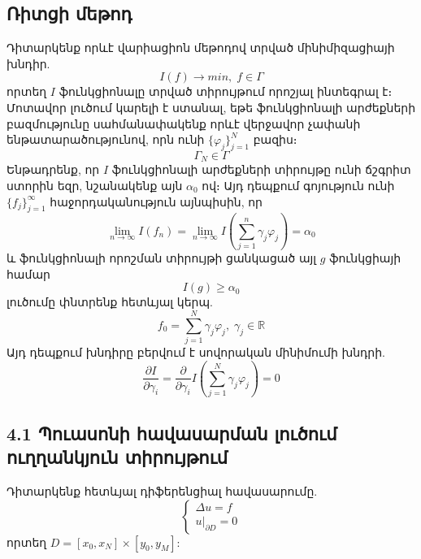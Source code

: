 \documentclass[fleqn, bachelor,subf,12pt,notitlepage]{article}
\begin{document}
\subsection*{Ռիտցի մեթոդ}
Դիտարկենք որևէ վարիացիոն մեթոդով տրված մինիմիզացիայի խնդիր.
		$$I\left(f\right) \longrightarrow min, \; f \in \Gamma$$
որտեղ $I$ ֆունկցիոնալը տրված տիրույթում որոշյալ ինտեգրալ է։
Մոտավոր լուծում կարելի է ստանալ, եթե ֆունկցիոնալի արժեքների բազմությունը սահմանափակենք որևէ վերջավոր չափանի ենթատարածությունով, որն ունի $\{\varphi_{j}\}_{j=1}^{N}$ բազիս։
			  $$\Gamma_{N} \in \Gamma $$
Ենթադրենք, որ $I$ ֆունկցիոնալի արժեքների տիրույթը ունի ճշգրիտ ստորին եզր, նշանակենք այն $\alpha_{0}$ ով։
Այդ դեպքում գոյություն ունի $\{f_{j}\}_{j=1}^{\infty}$ հաջորդականություն այնպիսին, որ
\begin{equation}
\lim_{n \to \infty}I\left(f_{n}\right) = \lim_{n \to \infty}I\left( \sum_{j=1}^{n} \gamma_{j}\varphi_{j} \right) = \alpha_{0}
\end{equation}
և ֆունկցիոնալի որոշման տիրույթի ցանկացած այլ $g$ ֆունկցիայի համար
			$$I\left(g\right) \geq \alpha_{0}$$
լուծումը փնտրենք հետևյալ կերպ.
\begin{equation}
f_{0}=\sum_{j=1}^{N}\gamma_{j}\varphi_{j}, \; \gamma_{j} \in \mathbb{R}
\end{equation}
Այդ դեպքում խնդիրը բերվում է սովորական մինիմումի խնդրի.
\begin{equation}
\dfrac{\partial I}{\partial \gamma_{i}} = \dfrac{\partial}{\partial \gamma_{i}} I \left(\sum_{j=1}^{N}\gamma_{j}\varphi_{j}\right) = 0
\end{equation}
\newpage
\subsection*{4.1 Պուասոնի հավասարման լուծում ուղղանկյուն տիրույթում}

Դիտարկենք հետևյալ դիֆերենցիալ հավասարումը.
\begin{equation}
\begin{cases}
			\Delta u =f \\
			u \Big |_{\partial D} = 0
\end{cases}
\end{equation}
որտեղ $D = \left[x_{0}, x_{N}\right] \times \left[y_{0}, y_{M}\right]$:
\end{document}
